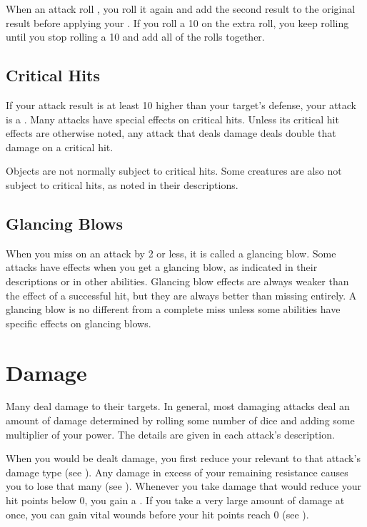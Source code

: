         When an attack roll , you roll it again and add the second result to the original result before applying your .
        If you roll a 10 on the extra roll, you keep rolling until you stop rolling a 10 and add all of the rolls together.

    \subsection{Critical Hits}\label{Critical Hits}
        If your attack result is at least 10 higher than your target's defense, your attack is a .
        Many attacks have special effects on critical hits.
        Unless its critical hit effects are otherwise noted, any attack that deals damage deals double that damage on a critical hit.

        Objects are not normally subject to critical hits.
        Some creatures are also not subject to critical hits, as noted in their descriptions.

    \subsection{Glancing Blows}\label{Glancing Blows}
        When you miss on an attack by 2 or less, it is called a glancing blow.
        Some attacks have effects when you get a glancing blow, as indicated in their descriptions or in other abilities.
        Glancing blow effects are always weaker than the effect of a successful hit, but they are always better than missing entirely.
        A glancing blow is no different from a complete miss unless some abilities have specific effects on glancing blows.

\section{Damage}\label{Damage}
    Many  deal damage to their targets.
    In general, most damaging attacks deal an amount of damage determined by rolling some number of dice and adding some multiplier of your power.
    The details are given in each attack's description.

    When you would be dealt damage, you first reduce your relevant  to that attack's damage type (see ).
    Any damage in excess of your remaining resistance causes you to lose that many  (see ).
    Whenever you take damage that would reduce your hit points below 0, you gain a .
    If you take a very large amount of damage at once, you can gain vital wounds before your hit points reach 0 (see ).

